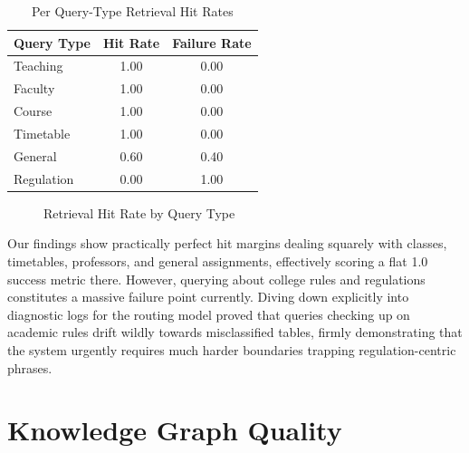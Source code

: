 \documentclass[12pt,a4paper]{report}
\begin{document}
\begin{table}[htbp]
  \centering
    \vspace*{5pt}
  \begin{tabular}{|l|c|c|}
    \hline
    \textbf{Query Type} & \textbf{Hit Rate} & \textbf{Failure Rate} \\ \hline
    Teaching & 1.00 & 0.00 \\ \hline
    Faculty & 1.00 & 0.00 \\ \hline
    Course & 1.00 & 0.00 \\ \hline
    Timetable & 1.00 & 0.00 \\ \hline
    General & 0.60 & 0.40 \\ \hline
    Regulation & 0.00 & 1.00 \\ \hline
  \end{tabular}
  \caption{Per Query-Type Retrieval Hit Rates}
  \label{tab:query_type_hit_rates}

\end{table}

\begin{figure}[htbp]
\centering
{}
\caption{Retrieval Hit Rate by Query Type}
\label{fig:query_type_hits}
\end{figure}

Our findings show practically perfect hit margins dealing squarely with classes, timetables, professors, and general assignments, effectively scoring a flat 1.0 success metric there. However, querying about college rules and regulations constitutes a massive failure point currently. Diving down explicitly into diagnostic logs for the routing model proved that queries checking up on academic rules drift wildly towards misclassified tables, firmly demonstrating that the system urgently requires much harder boundaries trapping regulation-centric phrases.

\section{Knowledge Graph Quality}
\end{document}
